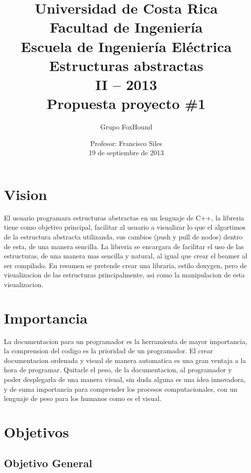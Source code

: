 \documentclass[12pt,letterpaper]{article}     %
\author{Grupo FoxHound   \vspace {10mm}}
\title{{Universidad de Costa Rica \\ 
		Facultad de Ingeniería \\
		Escuela de Ingeniería Eléctrica \\
		Estructuras abstractas \\
		II – 2013\\  		 
		\vspace* {50mm}			
		 Propuesta proyecto \#1 } \vspace* {50mm}}
\date{Profesor: Francisco Siles\\19 de septiembre de 2013}
\begin{document}
	\maketitle							%
	\newpage





\section{Vision}
 
El usuario programara estructuras abstractas en un lenguaje de C++, la libreria tiene como objetivo principal, facilitar al usuario a visualizar lo que el algortimos de la estructura abstracta utilizanda, sus cambios (push y pull de nodos) dentro de esta, de una manera sencilla. La libreria se encargara de facilitar el uso de las estructuras,  de una manera mas sencilla y natural, al igual que crear el beamer al ser compilado. En resumen se pretende crear una libraria, estilo doxygen, pero de visualizacion de las estructuras principalmente, asi como la manipulacion de esta visualizacion.

\section{Importancia}

La documentacion para un programador es la herramienta de mayor importancia, la comprension del codigo es la prioridad de un programador. El crear documentacion ordenada y visual de manera automatica es una gran ventaja a la hora de programar. Quitarle el peso, de la documentacion, al programador y poder desplegarla de una manera visual, sin duda alguna es una idea innovadora, y de suma importancia para comprender los procesos computacionales, con un lenguaje de peso para los humanos como es el visual.


\section{Objetivos}

\subsection{Objetivo General} 
\end{document}
